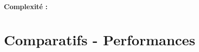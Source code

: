 			\begin{frame}
				\textbf{Complexité :}
			\end{frame}	
		
	\section{Comparatifs - Performances}	
		\begin{frame}
	
		\end{frame}
		
		\begin{frame}
	
		\end{frame}
		
		\begin{frame}
	
		\end{frame}
	

